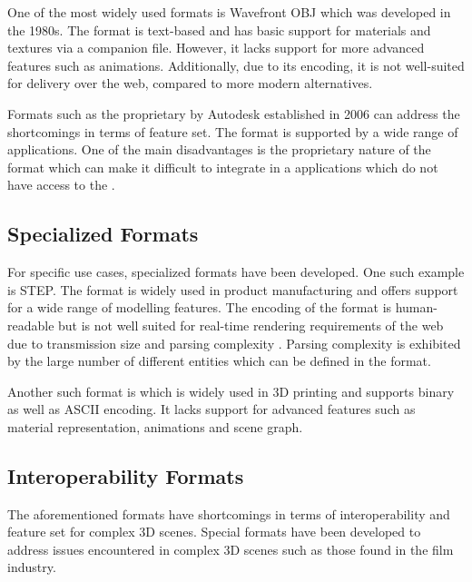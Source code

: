 One of the most widely used formats is Wavefront \gls{OBJ} which was developed in the 1980s. The format is text-based and has basic support for materials and textures via a companion  file. However, it lacks support for more advanced features such as animations. Additionally, due to its encoding, it is not well-suited for delivery over the web, compared to more modern alternatives.

Formats such as the proprietary  by Autodesk established in 2006 can address the shortcomings in terms of feature set. The format is supported by a wide range of applications. One of the main disadvantages is the proprietary nature of the format  which can make it difficult to integrate in a applications which do not have access to the .

\subsection*{Specialized Formats}
\label{ch:specializedFormats}

For specific use cases, specialized formats have been developed. One such example is \gls{STEP}. The format is widely used in product manufacturing and offers support for a wide range of modelling features. The  encoding of the format is human-readable but is not well suited for real-time rendering requirements of the web due to transmission size and parsing complexity \cite{marjudi2010StepIgesreview}. Parsing complexity is exhibited by the large number of different entities which can be defined in the format.

Another such format is  which is widely used in 3D printing and supports binary as well as \gls{ASCII} encoding. It lacks support for advanced features such as material representation, animations and scene graph.

\subsection*{Interoperability Formats}

The aforementioned formats have shortcomings in terms of interoperability and feature set for complex 3D scenes. Special formats have been developed to address issues encountered in complex 3D scenes such as those found in the film industry.


